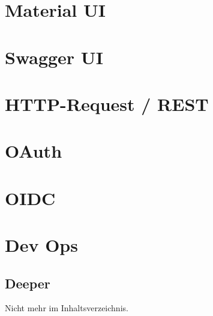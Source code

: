 \section{Material UI}

\section{Swagger UI}

\section{HTTP-Request / REST}

\section{OAuth}

\section{OIDC}

\section{Dev Ops}


\subsection{Deeper}
Nicht mehr im Inhaltsverzeichnis.
